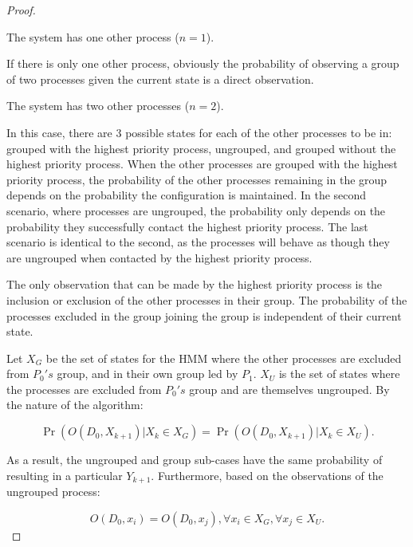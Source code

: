 \begin{proof}
\begin{case}
    The system has one other process ($n=1$).
\end{case}

If there is only one other process, obviously the probability of observing a group of two processes given the current state is a direct observation.

\begin{case}
    The system has two other processes ($n=2$).
\end{case}

In this case, there are 3 possible states for each of the other processes to be in: grouped with the highest priority process, ungrouped, and grouped without the highest priority process.
When the other processes are grouped with the highest priority process, the probability of the other processes remaining in the group depends on the probability the configuration is maintained.
In the second scenario, where processes are ungrouped, the probability only depends on the probability they successfully contact the highest priority process.
The last scenario is identical to the second, as the processes will behave as though they are ungrouped when contacted by the highest priority process.

The only observation that can be made by the highest priority process is the inclusion or exclusion of the other processes in their group.
The probability of the processes excluded in the group joining the group is independent of their current state.

Let $X_G$ be the set of states for the \ac{HMM} where the other processes are excluded from $P_0's$ group, and in their own group led by $P_1$.
$X_U$ is the set of states where the processes are excluded from $P_0's$ group and are themselves ungrouped.
By the nature of the algorithm: 

\begin{equation}
\Pr(O(D_0, X_{k+1}) | X_k \in X_G) = \Pr(O(D_0, X_{k+1}) | X_k \in X_U).
\label{eq:sameprob}
\end{equation}

As a result, the ungrouped and group sub-cases have the same probability of resulting in a particular $Y_{k+1}$.
Furthermore, based on the observations of the ungrouped process:

\begin{equation}
O(D_0, x_i) = O(D_0, x_j), \forall x_i \in X_G, \forall x_j \in X_U.
\end{equation}


\end{proof}
